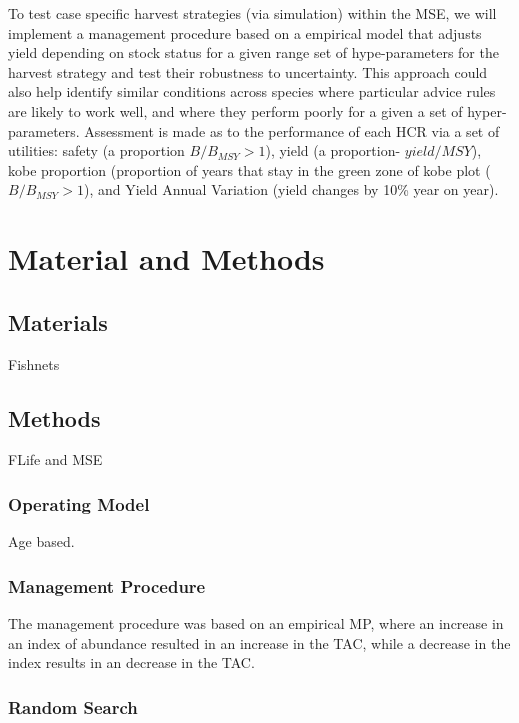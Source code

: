 \documentclass[preprint,12pt]{elsarticle}
\begin{document}
To test case specific harvest strategies (via simulation) within the MSE, we will implement a management procedure based on a empirical model that adjusts yield depending on stock status for a given range set of hype-parameters for the harvest strategy and test their robustness to uncertainty.  This approach could also help identify similar conditions across species where particular advice rules are likely to work well, and where they perform poorly for a given a set of hyper-parameters. Assessment is made as to the performance of each HCR via a set of utilities: safety (a proportion $B/B_{MSY} >1$), yield (a proportion- $yield/MSY$), kobe proportion (proportion of years that stay in the green zone of kobe plot ($B/B_{MSY} >1$), and Yield Annual Variation (yield changes by 10\% year on year).  


\section{Material and Methods}
\subsection{Materials}

Fishnets

\subsection{Methods}

FLife and MSE

\subsubsection{Operating Model}

Age based.

\subsubsection{Management Procedure}

The management procedure was based on an empirical MP, where an increase in an index of abundance resulted in an increase in the TAC, while a decrease in the index results in an decrease in the TAC.

\subsubsection{Random Search}

\end{document}
